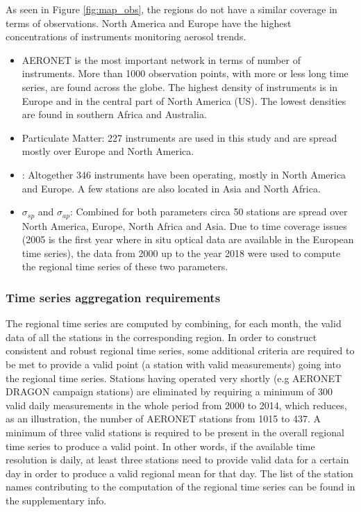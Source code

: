 \documentclass[acp, manuscript]{copernicus}
\begin{document}
As seen in Figure \ref{fig:map_obs}, the regions do not have a similar coverage in terms of observations. North America and Europe have the highest concentrations of instruments monitoring aerosol trends.
\begin{itemize}
 \item AERONET is the most important network in terms of number of instruments. More than 1000 observation points, with more or less long time series, are found across the globe. The highest density of instruments is in Europe and in the central part of North America (US). The lowest densities are found in southern Africa and Australia.
 \item Particulate Matter: 227 instruments are used in this study and are spread mostly over Europe and North America. 
 \item {}: Altogether 346 instruments have been operating, mostly in North America and Europe. A few stations are also located in Asia and North Africa.
 \item $\sigma_{sp}$ and $\sigma_{ap}$: Combined for both parameters circa 50 stations are spread over North America, Europe, North Africa and Asia. Due to time coverage issues (2005 is the first year where in situ optical data are available in the European time series), the data from 2000 up to the year 2018 were used to compute the regional time series of these two parameters.
\end{itemize}


\subsubsection{Time series aggregation requirements}
The regional time series are computed by combining, for each month, the valid data of all the stations in the corresponding region. In order to construct consistent and robust regional time series, some additional criteria are required to be met to provide a valid point (a station with valid measurements) going into the regional time series. Stations having operated very shortly (e.g AERONET DRAGON campaign stations) are eliminated by requiring a minimum of 300 valid daily measurements in the whole period from 2000 to 2014, which reduces, as an illustration, the number of AERONET stations from 1015 to 437. A minimum of three valid stations is required to be present in the overall regional time series to produce a valid point. In other words, if the available time resolution is daily, at least three stations need to provide valid data for a certain day in order to produce a valid regional mean for that day.  The list of the station names contributing to the computation of the regional time series can be found in the supplementary info.
\end{document}
